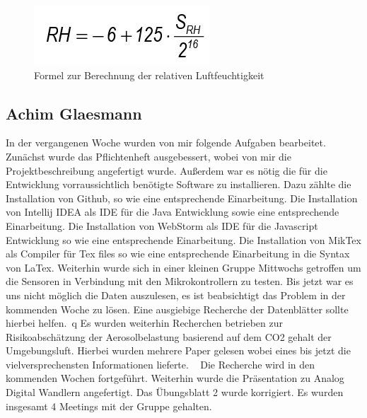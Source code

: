 \documentclass[]{article}
\begin{document}
\begin{figure}[h]
	\centering
	\includegraphics[scale=0.60]{images/sht21_rhformula}
	\caption{Formel zur Berechnung der relativen Luftfeuchtigkeit~\cite{datasheetsht21}}
	\label{img:sht21_rhformula}
\end{figure}

\subsection{Achim Glaesmann}
In der vergangenen Woche wurden von mir folgende Aufgaben bearbeitet. Zunächst wurde das Pflichtenheft ausgebessert, wobei von mir die Projektbeschreibung angefertigt wurde.
Außerdem war es nötig die für die Entwicklung vorraussichtlich benötigte Software zu installieren. 
Dazu zählte die Installation von Github, so wie eine entsprechende Einarbeitung. Die Installation von Intellij IDEA als IDE für die Java Entwicklung sowie eine entsprechende Einarbeitung.
Die Installation von WebStorm als IDE für die Javascript Entwicklung so wie eine entsprechende Einarbeitung. Die Installation von MikTex als Compiler für Tex files so wie eine entsprechende 
Einarbeitung in die Syntax von LaTex. Weiterhin wurde sich in einer kleinen Gruppe Mittwochs getroffen um die Sensoren in Verbindung mit den Mikrokontrollern zu testen. Bis 
jetzt war es uns nicht möglich die Daten auszulesen, es ist beabsichtigt das Problem in der kommenden Woche zu lösen. Eine ausgiebige Recherche der Datenblätter sollte hierbei
helfen.~\cite{datasheetsht21}q Es wurden weiterhin Recherchen betrieben zur Risikoabschätzung der Aerosolbelastung basierend auf dem CO2 gehalt der Umgebungsluft. Hierbei wurden mehrere Paper gelesen wobei 
eines bis jetzt die vielversprechensten Informationen lieferte. ~\cite{co2letter} Die Recherche wird in den kommenden Wochen fortgeführt. Weiterhin wurde die Präsentation zu Analog Digital Wandlern 
angefertigt. Das Übungsblatt 2 wurde korrigiert. Es wurden insgesamt 4 Meetings mit der Gruppe gehalten.
\end{document}
